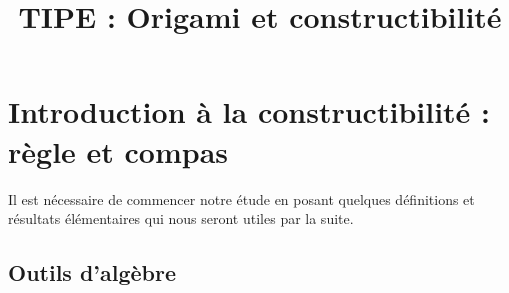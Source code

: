 \documentclass[a4paper,12pt,french]{report}
\title{TIPE : Origami et constructibilité}
\begin{document}
\newtheorem*{remarque}{Remarque}
\maketitle
\renewcommand{\contentsname}{Sommaire}
\tableofcontents{}


\chapter{Introduction à la constructibilité : règle et compas}
		Il est nécessaire de commencer notre étude en posant quelques définitions et résultats élémentaires qui nous seront utiles par la suite.

		\section{Outils d'algèbre}
			
\end{document}
